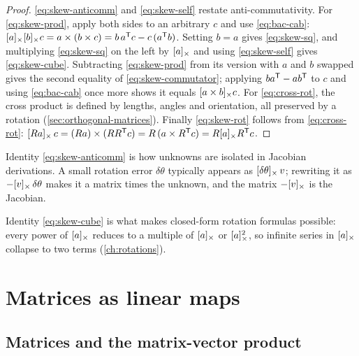 \begin{proof}
\eqref{eq:skew-anticomm} and \eqref{eq:skew-self} restate anti-commutativity. For \eqref{eq:skew-prod}, apply both sides to
an arbitrary $c$ and use \eqref{eq:bac-cab}: $[a]_{\times}[b]_{\times}c = a\times(b\times c) = b\,a^{\mathsf{T}} c - c\,(a^{\mathsf{T}} b)$. Setting $b = a$ gives
\eqref{eq:skew-sq}, and multiplying \eqref{eq:skew-sq} on the left by $[a]_{\times}$ and using \eqref{eq:skew-self} gives
\eqref{eq:skew-cube}. Subtracting \eqref{eq:skew-prod} from its version with $a$ and $b$ swapped gives the second equality
of \eqref{eq:skew-commutator}; applying $ba^{\mathsf{T}} - ab^{\mathsf{T}}$ to $c$ and using \eqref{eq:bac-cab} once more shows it equals
$[a\times b]_{\times}c$. For \eqref{eq:cross-rot}, the cross product is defined by lengths, angles and orientation, all
preserved by a rotation (\cref{sec:orthogonal-matrices}). Finally \eqref{eq:skew-rot} follows from \eqref{eq:cross-rot}:
$[Ra]_{\times}\,c = (Ra)\times(RR^{\mathsf{T}} c) = R\,(a \times R^{\mathsf{T}} c) = R[a]_{\times}R^{\mathsf{T}} c$.
\end{proof}

\begin{keyidea}
Identity \eqref{eq:skew-anticomm} is how unknowns are isolated in Jacobian derivations. A small rotation error
$\delta\theta$ typically appears as $[\delta\theta]_{\times}\,v$; rewriting it as $-[v]_{\times}\,\delta\theta$ makes it a matrix
times the unknown, and the matrix $-[v]_{\times}$ is the Jacobian.
\end{keyidea}

Identity \eqref{eq:skew-cube} is what makes closed-form rotation formulas possible: every power of $[a]_{\times}$ reduces to
a multiple of $[a]_{\times}$ or $[a]_{\times}^2$, so infinite series in $[a]_{\times}$ collapse to two terms (\cref{ch:rotations}).

\section{Matrices as linear maps}
\label{sec:matrices}

\subsection{Matrices and the matrix-vector product}

